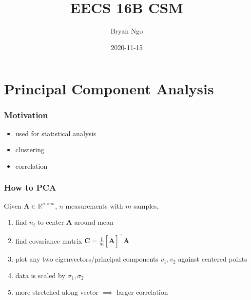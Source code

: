 \documentclass[aspectratio=169]{beamer}
\title{EECS 16B CSM}
\author{Bryan Ngo}
\date{2020-11-15}
\institute{UC Berkeley}
\newcommand{\R}{\mathbb{R}}
\newcommand{\tpose}[1]{\left[#1\right]^{\! \top} \!\!}
\begin{document}
\begin{frame}
    \maketitle
\end{frame}

\section{Principal Component Analysis}

\begin{frame}
    \frametitle{Motivation}

    \begin{itemize}
        \item used for statistical analysis
        \item clustering
        \item correlation
    \end{itemize}
\end{frame}

\begin{frame}
    \frametitle{How to PCA}

    Given \(\bm{A} \in \R^{n \times m}\), \(n\) measurements with \(m\) samples,
    \begin{enumerate}
        \item find \(\overline{n_i}\) to center \(\bm{A}\) around mean
        \item find covariance matrix \(\bm{C} = \frac{1}{m} \tpose{\widetilde{\bm{A}}} \widetilde{\bm{A}}\)
        \item plot any two eigenvectors/principal components \(v_1, v_2\) against centered points
        \item data is scaled by \(\sigma_1, \sigma_2\)
        \item more stretched along vector \(\implies\) larger correlation
    \end{enumerate}
\end{frame}
\end{document}
